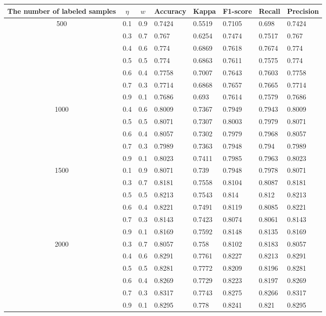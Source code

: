 \begin{tabular}{|c|c|c|l|l|l|l|l|}
\hline
The number of labeled samples&$\eta$&$w$&Accuracy&Kappa&F1-score&Recall&Precision\\
\hline
\multirow{7}{*}{500}&0.1&0.9&0.7424&0.5519&0.7105&0.698&0.7424\\
\cline{2
-
8}
&0.3&0.7&0.767&0.6254&0.7474&0.7517&0.767\\
\cline{2
-
8}
&0.4&0.6&0.774&0.6869&0.7618&0.7674&0.774\\
\cline{2
-
8}
&0.5&0.5&0.774&0.6863&0.7611&0.7575&0.774\\
\cline{2
-
8}
&0.6&0.4&0.7758&0.7007&0.7643&0.7603&0.7758\\
\cline{2
-
8}
&0.7&0.3&0.7714&0.6868&0.7657&0.7665&0.7714\\
\cline{2
-
8}
&0.9&0.1&0.7686&0.693&0.7614&0.7579&0.7686\\
\hline
\multirow{5}{*}{1000}&0.4&0.6&0.8009&0.7367&0.7949&0.7943&0.8009\\
\cline{2
-
8}
&0.5&0.5&0.8071&0.7307&0.8003&0.7979&0.8071\\
\cline{2
-
8}
&0.6&0.4&0.8057&0.7302&0.7979&0.7968&0.8057\\
\cline{2
-
8}
&0.7&0.3&0.7989&0.7363&0.7948&0.794&0.7989\\
\cline{2
-
8}
&0.9&0.1&0.8023&0.7411&0.7985&0.7963&0.8023\\
\hline
\multirow{6}{*}{1500}&0.1&0.9&0.8071&0.739&0.7948&0.7978&0.8071\\
\cline{2
-
8}
&0.3&0.7&0.8181&0.7558&0.8104&0.8087&0.8181\\
\cline{2
-
8}
&0.5&0.5&0.8213&0.7543&0.814&0.812&0.8213\\
\cline{2
-
8}
&0.6&0.4&0.8221&0.7491&0.8119&0.8085&0.8221\\
\cline{2
-
8}
&0.7&0.3&0.8143&0.7423&0.8074&0.8061&0.8143\\
\cline{2
-
8}
&0.9&0.1&0.8169&0.7592&0.8148&0.8135&0.8169\\
\hline
\multirow{6}{*}{2000}&0.3&0.7&0.8057&0.758&0.8102&0.8183&0.8057\\
\cline{2
-
8}
&0.4&0.6&0.8291&0.7761&0.8227&0.8213&0.8291\\
\cline{2
-
8}
&0.5&0.5&0.8281&0.7772&0.8209&0.8196&0.8281\\
\cline{2
-
8}
&0.6&0.4&0.8269&0.7729&0.8223&0.8197&0.8269\\
\cline{2
-
8}
&0.7&0.3&0.8317&0.7743&0.8275&0.8266&0.8317\\
\cline{2
-
8}
&0.9&0.1&0.8295&0.778&0.8241&0.821&0.8295\\
\hline
\end{tabular}
